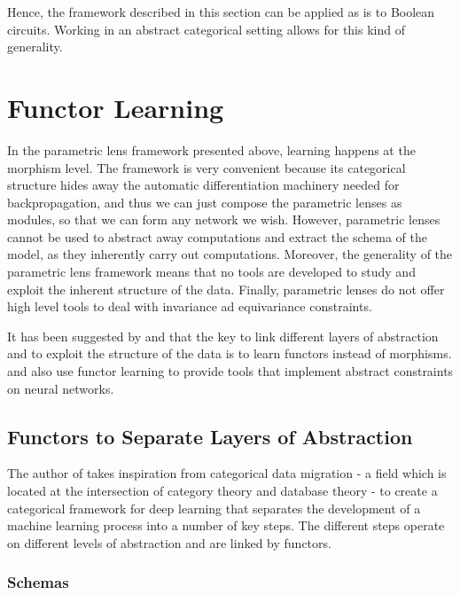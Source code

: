 \documentclass[12pt,a4paper,openright,twoside]{report}
\theoremstyle{plain}
\theoremstyle{definition}
\begin{document}
Hence, the framework described in this section can be applied as is to Boolean circuits. Working in an abstract categorical setting allows for this kind of generality. 





\section{Functor Learning}

In the parametric lens framework presented above, learning happens at the morphism level. The framework is very convenient because its categorical structure hides away the automatic differentiation machinery needed for backpropagation, and thus we can just compose the parametric lenses as modules, so that we can form any network we wish. However, parametric lenses cannot be used to abstract away computations and extract the schema of the model, as they inherently carry out computations. Moreover, the generality of the parametric lens framework means that no tools are developed to study and exploit the inherent structure of the data. Finally, parametric lenses do not offer high level tools to deal with invariance ad equivariance constraints. 

It has been suggested by \cite{gavranovic2019compositional} and \cite{sheshmani2021categorical} that the key to link different layers of abstraction and to exploit the structure of the data is to learn functors instead of morphisms. \cite{gavranovic2019compositional} and \cite{vaswani2017attention} also use functor learning to provide tools that implement abstract constraints on neural networks.



\subsection{Functors to Separate Layers of Abstraction}

The author of \cite{gavranovic2019compositional} takes inspiration from categorical data migration - a field which is located at the intersection of category theory and database theory - to create a categorical framework for deep learning that separates the development of a machine learning process into a number of key steps. The different steps operate on different levels of abstraction and are linked by functors.

\subsubsection{Schemas}
\end{document}
